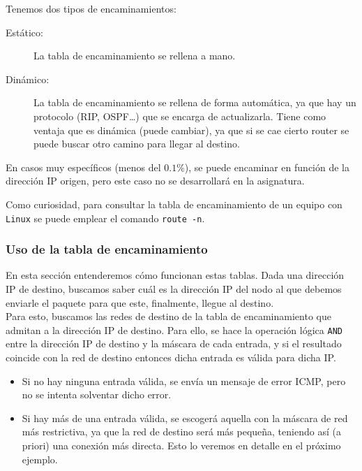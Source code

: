 \noindent
Tenemos dos tipos de encaminamientos:
\begin{description}
    \item [Estático:] La tabla de encaminamiento se rellena a mano.
    \item [Dinámico:] La tabla de encaminamiento se rellena de forma automática, ya que hay un protocolo (\acrshort{RIP}, \acrshort{OSPF}\ldots) que se encarga de actualizarla. Tiene como ventaja que es dinámica (puede cambiar), ya que si se cae cierto router se puede buscar otro camino para llegar al destino.
\end{description}

\begin{observacion}
    En casos muy específicos (menos del $0.1\%$), se puede encaminar en función de la dirección IP origen, pero este caso no se desarrollará en la asignatura.
\end{observacion}

\begin{observacion}
    Como curiosidad, para consultar la tabla de encaminamiento de un equipo con \verb|Linux| se puede emplear el comando \verb|route -n|.
\end{observacion}

\subsubsection{Uso de la tabla de encaminamiento}

En esta sección entenderemos cómo funcionan estas tablas. Dada una dirección IP de destino, buscamos saber cuál es la dirección IP del nodo al que debemos enviarle el paquete para que este, finalmente, llegue al destino.\\

Para esto, buscamos las redes de destino de la tabla de encaminamiento que admitan a la dirección IP de destino. Para ello, se hace la operación lógica \verb|AND| entre la dirección IP de destino y la máscara de cada entrada, y si el resultado coincide con la red de destino entonces dicha entrada es válida para dicha IP\@.
\begin{itemize}
    \item Si no hay ninguna entrada válida, se envía un mensaje de error \acrshort{ICMP}, pero no se intenta solventar dicho error.
    \item Si hay más de una entrada válida, se escogerá aquella con la máscara de red más restrictiva, ya que la red de destino será más pequeña, teniendo así (a priori) una conexión más directa. Esto lo veremos en detalle en el próximo ejemplo.
\end{itemize}

